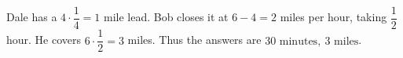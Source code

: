 Dale has a $4\cdot\dfrac{1}{4}=1$ mile lead. Bob closes it at $6-4=2$ miles per hour, taking $\dfrac{1}{2}$ hour. He covers $6\cdot\dfrac{1}{2}=3$ miles. Thus the answers are $\boxed{30\text{ minutes},\ 3\text{ miles}}$.
